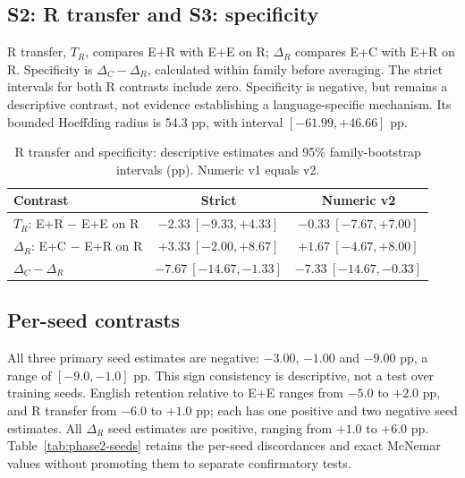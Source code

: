 \subsection{S2: R transfer and S3: specificity}
R transfer, $T_R$, compares E+R with E+E on R; $\Delta_R$ compares E+C with E+R on R. Specificity is $\Delta_C-\Delta_R$, calculated within family before averaging. The strict intervals for both R contrasts include zero. Specificity is negative, but remains a descriptive contrast, not evidence establishing a language-specific mechanism. Its bounded Hoeffding radius is 54.3 pp, with interval $[-61.99,+46.66]$ pp.

\begin{table}[H]
\centering\small\singlespacing
\caption{R transfer and specificity: descriptive estimates and 95\% family-bootstrap intervals (pp). Numeric v1 equals v2.}
\label{tab:phase2-transfer}
\begin{tabular}{@{}lcc@{}}
\toprule
Contrast & Strict & Numeric v2\\
\midrule
$T_R$: E+R $-$ E+E on R & $-2.33\ [-9.33,+4.33]$ & $-0.33\ [-7.67,+7.00]$\\
$\Delta_R$: E+C $-$ E+R on R & $+3.33\ [-2.00,+8.67]$ & $+1.67\ [-4.67,+8.00]$\\
$\Delta_C-\Delta_R$ & $-7.67\ [-14.67,-1.33]$ & $-7.33\ [-14.67,-0.33]$\\
\bottomrule
\end{tabular}
\end{table}


\subsection{Per-seed contrasts}
All three primary seed estimates are negative: $-3.00$, $-1.00$ and $-9.00$ pp, a range of $[-9.0,-1.0]$ pp. This sign consistency is descriptive, not a test over training seeds. English retention relative to E+E ranges from $-5.0$ to $+2.0$ pp, and R transfer from $-6.0$ to $+1.0$ pp; each has one positive and two negative seed estimates. All $\Delta_R$ seed estimates are positive, ranging from $+1.0$ to $+6.0$ pp. Table~\ref{tab:phase2-seeds} retains the per-seed discordances and exact McNemar values without promoting them to separate confirmatory tests.

